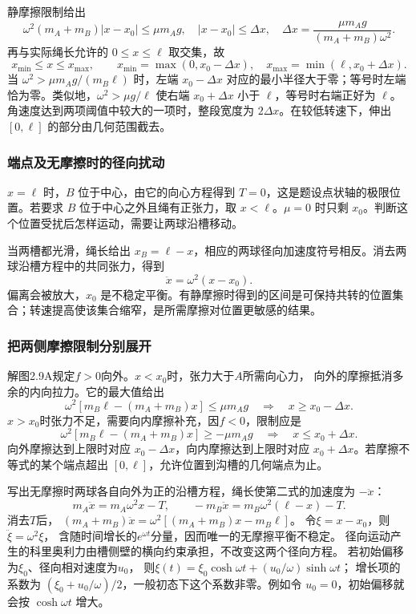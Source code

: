 \documentclass[UTF8,fontset=fandol,a4paper,11pt]{ctexart}
\begin{document}
静摩擦限制给出
\[
\omega^2(m_A+m_B)|x-x_0|\leq\mu m_Ag,
\quad |x-x_0|\leq\Delta x,
\quad \Delta x=\frac{\mu m_Ag}{(m_A+m_B)\omega^2}.
\]
再与实际绳长允许的 $0\leq x\leq\ell$ 取交集，故
\[
\boxed{x_{\min}\leq x\leq x_{\max}},\qquad
x_{\min}=\max(0,x_0-\Delta x),\quad
x_{\max}=\min(\ell,x_0+\Delta x).
\]
当 $\omega^2>\mu m_Ag/(m_B\ell)$ 时，左端 $x_0-\Delta x$ 对应的最小半径大于零；等号时左端恰为零。类似地，$\omega^2>\mu g/\ell$ 使右端 $x_0+\Delta x$ 小于 $\ell$，等号时右端正好为 $\ell$。角速度达到两项阈值中较大的一项时，整段宽度为 $2\Delta x$。在较低转速下，伸出 $[0,\ell]$ 的部分由几何范围截去。

\subsubsection*{端点及无摩擦时的径向扰动}
$x=\ell$ 时，$B$ 位于中心，由它的向心方程得到 $T=0$，这是题设点状轴的极限位置。若要求 $B$ 位于中心之外且绳有正张力，取 $x<\ell$。$\mu=0$ 时只剩 $x_0$。判断这个位置受扰后怎样运动，需要让两球沿槽移动。

当两槽都光滑，绳长给出 $x_B=\ell-x$，相应的两球径向加速度符号相反。消去两球沿槽方程中的共同张力，得到
\[
\ddot x=\omega^2(x-x_0).
\]
偏离会被放大，$x_0$ 是不稳定平衡。有静摩擦时得到的区间是可保持共转的位置集合；转速提高使该集合缩窄，是所需摩擦对位置更敏感的结果。
\subsubsection*{把两侧摩擦限制分别展开}
解图2.9A规定$f>0$向外。$x<x_0$时，张力大于$A$所需向心力，
向外的摩擦抵消多余的内向拉力。它的最大值给出
\[
\omega^2[m_B\ell-(m_A+m_B)x]\leq\mu m_Ag
\quad\Longrightarrow\quad x\geq x_0-\Delta x.
\]
$x>x_0$时张力不足，需要向内摩擦补充，因$f<0$，限制应是
\[
\omega^2[m_B\ell-(m_A+m_B)x]\geq-\mu m_Ag
\quad\Longrightarrow\quad x\leq x_0+\Delta x.
\]
向外摩擦达到上限时对应 $x_0-\Delta x$，向内摩擦达到上限时对应 $x_0+\Delta x$。若摩擦不等式的某个端点超出 $[0,\ell]$，允许位置到沟槽的几何端点为止。

写出无摩擦时两球各自向外为正的沿槽方程，绳长使第二式的加速度为 $-\ddot x$：
\[
m_A\ddot x=m_A\omega^2x-T,\qquad
-m_B\ddot x=m_B\omega^2(\ell-x)-T.
\]
消去$T$后，
$(m_A+m_B)\ddot x=\omega^2[(m_A+m_B)x-m_B\ell]$。
令$\xi=x-x_0$，则$\ddot\xi=\omega^2\xi$，
含随时间增长的$e^{\omega t}$分量，因而唯一的无摩擦平衡不稳定。
径向运动产生的科里奥利力由槽侧壁的横向约束承担，不改变这两个径向方程。
若初始偏移为$\xi_0$、径向相对速度为$u_0$，
则$\xi(t)=\xi_0\cosh\omega t+(u_0/\omega)\sinh\omega t$；
增长项的系数为 $(\xi_0+u_0/\omega)/2$，一般初态下这个系数非零。例如令 $u_0=0$，初始偏移就会按 $\cosh\omega t$ 增大。
\end{document}
